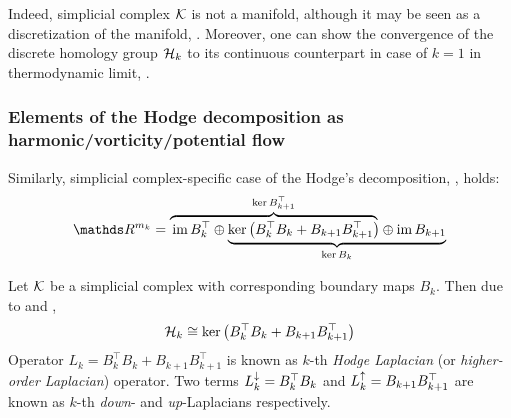 \begin{remark}
\end{remark}




Indeed, simplicial complex \( \mathcal{K} \) is not a manifold, although it may be seen as a discretization of the manifold, . Moreover, one can show the convergence of the discrete homology group \( \mathcal{H}_k \) to its continuous counterpart in case of \( k = 1 \) in thermodynamic limit, .



\subsubsection{ Elements of the Hodge decomposition as harmonic/vorticity/potential flow}

Similarly, simplicial complex-specific case of the Hodge's decomposition, , holds:
\begin{equation}
      \ds R^{m_k} = \lefteqn{\overbrace{\phantom{\im B_k^\top \oplus  \ker \left( B_k^\top B_k + B_{k+1} B_{k+1}^\top \right)}}^{\ker B_{k+1}^\top}} \im B_k^\top \oplus
      \underbrace{\ker \left( B_k^\top B_k + B_{k+1} B_{k+1}^\top \right) \oplus  \im B_{k+1}}_{\ker B_k}            
\end{equation}


\begin{definition}
      Let \( \mathcal{K} \) be a simplicial complex with corresponding boundary maps \( B_k \). Then due to  and ,
      \begin{equation}
            \mathcal{H}_k \cong \ker \left( B_k^\top B_k + B_{k+1} B_{k+1}^\top \right)
      \end{equation}
      Operator \( L_k =  B_k^\top B_k + B_{k+1} B_{k+1}^\top \) is known as \(k\)-th \emph{Hodge Laplacian} (or \emph{higher-order Laplacian}) operator. Two terms \( L_{k}^{\downarrow} =B_k^\top B_k  \) and \( L_{k}^{\uparrow} = B_{k+1} B_{k+1}^\top \) are known as \(k\)-th \emph{down}- and \emph{up}-Laplacians respectively.
\end{definition}

